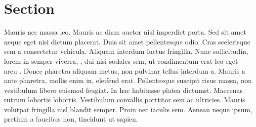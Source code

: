 \section {Section}
Mauris nec massa leo. Mauris ac diam auctor nisl imperdiet porta. Sed sit amet neque eget nisi dictum placerat. Duis sit amet pellentesque odio. Cras scelerisque sem a consectetur vehicula. Aliquam interdum luctus fringilla. Nunc sollicitudin, lorem in semper viverra, \citet{Goldreich_1990}, dui nisi sodales sem, ut condimentum erat leo eget arcu \citep{Goldreich_1990,Kumar_1994,Raman}. Donec pharetra aliquam metus, non pulvinar tellus interdum a. Mauris a ante pharetra, mollis enim in, eleifend erat. Pellentesque suscipit risus massa, non vestibulum libero euismod feugiat. In hac habitasse platea dictumst. Maecenas rutrum lobortis lobortis. Vestibulum convallis porttitor sem ac ultricies. Mauris volutpat fringilla nisl blandit semper. Proin nec iaculis sem. Aenean neque ipsum, pretium a faucibus non, tincidunt ut sapien.
